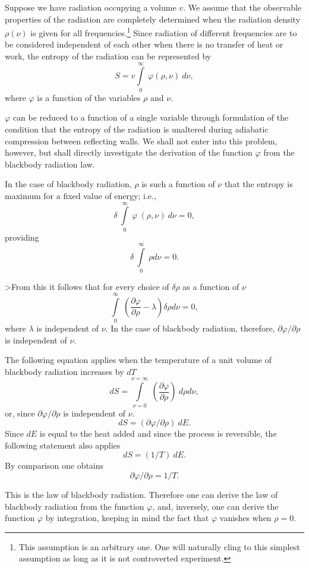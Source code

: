 \documentclass[12pt]{article}
\begin{document}
Suppose we have radiation occupying a volume $v$. We assume that the observable
properties of the radiation are completely determined when the radiation density
$\rho(\nu)$ is given for all frequencies.\footnote{This assumption is an
arbitrary one. One will naturally cling to this simplest assumption as long as
it is not controverted experiment.} Since radiation of different frequencies are
to be considered independent of each other when there is no transfer of heat or
work, the entropy of the radiation can be represented by 
$$
S = v \int \limits^{\infty}_0~ \varphi (\rho, \nu)~ d \nu,
$$
where $\varphi$ is a function of the variables $\rho$ and $\nu$. 

$\varphi$ can be  reduced to a function of a  single  variable through
formulation  of the  condition  that the  entropy of the  radiation is
unaltered during  adiabatic  compression between  reflecting walls. We
shall  not  enter into  this   problem,  however, but  shall  directly
investigate the  derivation of the function  
$\varphi$ from the blackbody
radiation law.

In the case of blackbody radiation, $\rho$ is such 
a function of $\nu$ that the
entropy is maximum for a fixed value of energy; i.e.,
$$
\delta~ \int \limits^{\infty}_0~ \varphi~(\rho, \nu)~ d \nu = 0,
$$
providing
$$
\delta~ \int \limits^{\infty}_0~ \rho d \nu = 0.
$$

>From this it follows that for every choice of $\delta \rho$  as a function of 
$\nu$
$$
\int \limits^{\infty}_0~ \left( \frac{\partial \varphi}{\partial \rho} - 
\lambda \right)  \delta \rho d \nu = 0,
$$
where $\lambda$ is independent of $\nu$. In the case of blackbody radiation,
therefore, 
$\partial \varphi/ \partial \rho$ is independent of $\nu$.

The following equation applies when the temperature of a unit volume of
blackbody radiation increases by $dT$
$$
dS = \int \limits^{\nu = \infty}_{\nu = 0}~ \left( \frac{\partial \varphi}
{\partial \rho} \right)~d \rho d \nu,
$$
or, since $\partial \varphi / \partial \rho$ is independent of $\nu$.
$$
dS = (\partial \varphi/ \partial \rho) ~ dE.
$$
Since $dE$ is equal to the heat added and since the 
process is reversible, the
following statement also applies
$$
dS = (1/T) ~ dE.
$$
By comparison one obtains
$$
\partial \varphi/ \partial \rho = 1/T.
$$

This is the law of blackbody radiation. Therefore one can derive the law of
blackbody radiation from the function 
$\varphi$, and, inversely, one can derive the
function $\varphi$ by integration, keeping in mind the fact 
that $\varphi$ vanishes
when $\rho = 0$.
\end{document}
